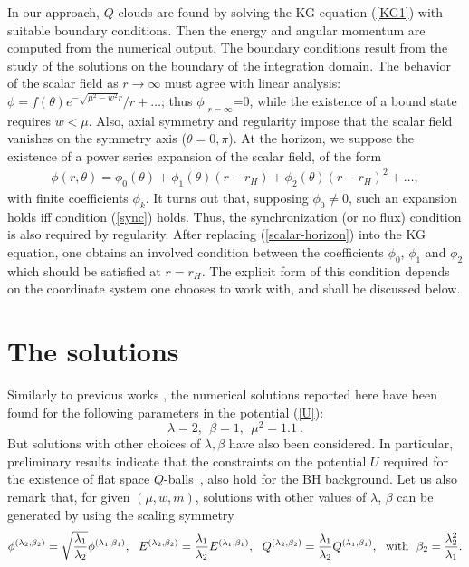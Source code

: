  
In our approach, $Q$-clouds are found by solving the KG equation (\ref{KG1})
with suitable boundary conditions.  
Then the energy and angular momentum are computed
from the numerical output.
The boundary conditions result from the study of the solutions
on the boundary of the integration domain. 
The behavior of the scalar field as $r\to \infty$ must agree
with linear analysis: $\phi=f(\theta)  {e^{-\sqrt{\mu^2-w^2}r}}/{r}+\dots$;
thus $\phi|_{r=\infty}$=0, while the existence of a bound state requires $w <\mu $.
Also, axial symmetry and
regularity impose that the scalar field vanishes on the symmetry axis ($\theta=0,\pi$).
At the horizon, we suppose the existence of a power series expansion of the scalar field,
of the form
\begin{eqnarray}
\label{scalar-horizon}
\phi(r,\theta)=\phi_{0}( \theta)+\phi_{1}( \theta)(r-r_H)+\phi_{2}( \theta)(r-r_H)^2+\dots,
\end{eqnarray}
with finite coefficients $\phi_{k}$.
%
It turns out that, supposing $\phi_{0}\neq 0$, such an  expansion holds iff condition (\ref{sync}) holds. 
Thus, the synchronization (or no flux) condition is also required by regularity. 
After replacing (\ref{scalar-horizon})  into the KG equation, one obtains an involved condition between the coefficients
$\phi_{0}$, $\phi_{1}$ and $\phi_{2}$ 
which should be satisfied at $r=r_H$.
The explicit form of this condition depends on the coordinate system one chooses to work with,
and shall be discussed below.

 

\section{The solutions}

 
Similarly to previous works 
\cite{Volkov:2002aj,Kleihaus:2005me}, 
the  numerical solutions reported here have been found for 
the following parameters in 
the potential
(\ref{U}):
%
\begin{equation}
\lambda = 2,~~\beta=1,~~\mu^2=1.1~.
\label{param}
\end{equation} 
But solutions with other choices of $\lambda,\beta$
have also been considered.
%
In particular, preliminary results indicate that the constraints
on the potential $U$  required
for the existence of flat space $Q$-balls~\cite{Coleman:1985ki}, 
also hold for the BH background. 
%
Let us also remark that,
for given $(\mu,w,m)$,
solutions with other values of $\lambda$, $\beta$
can be generated by using the scaling symmetry
\begin{equation}
\phi^{(\lambda_2,\beta_2)}=\sqrt{\frac{\lambda_1}{\lambda_2}}\phi^{(\lambda_1,\beta_1)},~~
E^{(\lambda_2,\beta_2)}=\frac{\lambda_1}{\lambda_2}E^{(\lambda_1,\beta_1)},~~Q^{(\lambda_2,\beta_2)}=\frac{\lambda_1}{\lambda_2}Q^{(\lambda_1,\beta_1)},~~
{\rm with}~~\beta_2=\frac{\lambda_2^2}{\lambda_1}.
\label{symm}
\end{equation} 


